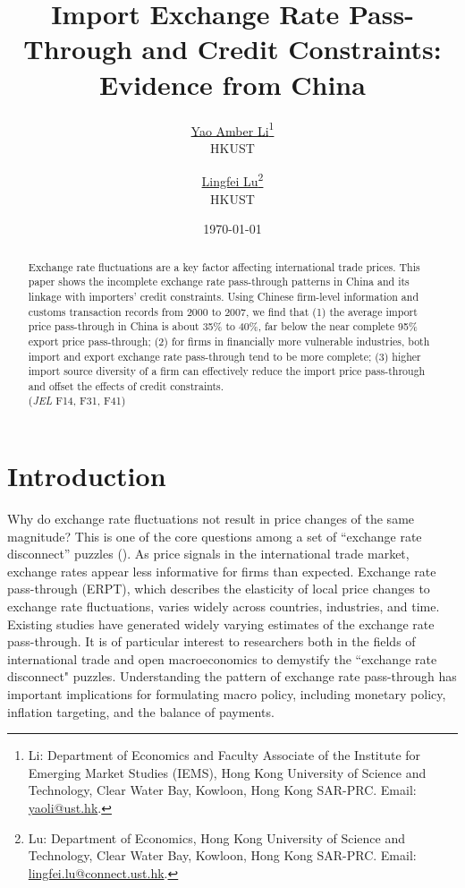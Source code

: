 \documentclass[12pt]{article}
\begin{document}
\title{  \Large \textbf{Import Exchange Rate Pass-Through and Credit Constraints: Evidence from China}}

\author{\large \href{http://yaoli.people.ust.hk/}{Yao Amber Li}\thanks{Li: Department of Economics and Faculty Associate of the Institute for Emerging Market Studies (IEMS), Hong Kong University of Science and Technology, Clear Water Bay, Kowloon, Hong Kong SAR-PRC. Email: \href{mailto:yaoli@ust.hk}{yaoli@ust.hk}.}\\ \large{HKUST}
\and \large \href{}{Lingfei Lu}\thanks{Lu: Department of Economics, Hong Kong University of Science and Technology, Clear Water Bay, Kowloon, Hong Kong SAR-PRC. Email: \href{mailto:}{lingfei.lu@connect.ust.hk}.} \\ \large{HKUST}
 }

\date{\today }

\maketitle

\begin{abstract}
Exchange rate fluctuations are a key factor affecting international trade prices. This paper shows the incomplete exchange rate pass-through patterns in China and its linkage with importers' credit constraints. Using Chinese firm-level information and customs transaction records from 2000 to 2007, we find that (1) the average import price pass-through in China is about 35\% to 40\%, far below the near complete 95\% export price pass-through; (2) for firms in financially more vulnerable industries, both import and export exchange rate pass-through tend to be more complete; (3) higher import source diversity of a firm can effectively reduce the import price pass-through and offset the effects of credit constraints.\\
(\textit{JEL} F14, F31, F41)

\end{abstract}

\section{Introduction} \label{Introduction}

Why do exchange rate fluctuations not result in price changes of the same magnitude? This is one of the core questions among a set of ``exchange rate disconnect'' puzzles (\cite{obstfeld2000}). As price signals in the international trade market, exchange rates appear less informative for firms than expected. Exchange rate pass-through (ERPT), which describes the elasticity of local price changes to exchange rate fluctuations, varies widely across countries, industries, and time. Existing studies have generated widely varying estimates of the exchange rate pass-through. It is of particular interest to researchers both in the fields of international trade and open macroeconomics to demystify the ``exchange rate disconnect" puzzles. Understanding the pattern of exchange rate pass-through has important implications for formulating macro policy, including monetary policy, inflation targeting, and the balance of payments.
\end{document}
